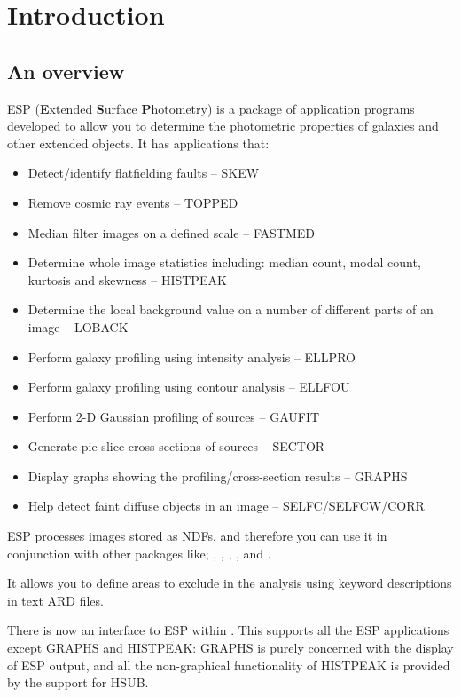 \documentclass[twoside,11pt]{starlink}
\begin{document}
\scfrontmatter

\section{Introduction}
\label{sec:introduction}

\subsection{An overview}

ESP (\textbf{E}xtended \textbf{S}urface \textbf{P}hotometry) is a package
of application programs developed to allow you to determine the photometric
properties of galaxies and other extended objects. It has applications that:
\begin{itemize}
\item Detect/identify flatfielding faults -- SKEW
\item Remove cosmic ray events -- TOPPED
\item Median filter images on a defined scale -- FASTMED
\item Determine whole image statistics including: median count, modal count,
kurtosis and skewness -- HISTPEAK
\item Determine the local background value on a number of different parts
of an image -- LOBACK
\item Perform galaxy profiling using intensity analysis -- ELLPRO
\item Perform galaxy profiling using contour analysis -- ELLFOU
\item Perform 2-D Gaussian profiling of sources -- GAUFIT
\item Generate pie slice cross-sections of sources -- SECTOR
\item Display graphs showing the profiling/cross-section results -- GRAPHS
\item Help detect faint diffuse objects in an image -- SELFC/SELFCW/CORR
\end{itemize}

ESP processes images stored as NDFs, and therefore you can use it in
conjunction with other packages like;
,
,
,
,
 and
.

It allows you to define areas to exclude in the analysis
using keyword descriptions in text ARD files.

There is now an interface to ESP within
.  This supports all the ESP applications except
GRAPHS and HISTPEAK: GRAPHS is purely concerned with the display of
ESP output, and all the non-graphical functionality of HISTPEAK is
provided by the support for HSUB.
\end{document}
